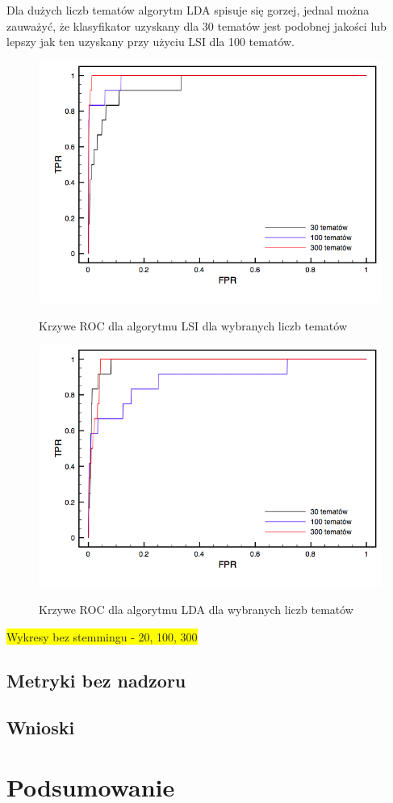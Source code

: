 \documentclass[11pt,a4paper]{article}
\newcommand{\todo}[1]{\colorbox{yellow}{#1}}
\begin{document}
Dla dużych liczb tematów algorytm LDA spisuje się gorzej, jednal można
zauważyć, że klasyfikator uzyskany dla 30 tematów jest podobnej jakości lub
lepszy jak ten uzyskany przy użyciu LSI dla 100 tematów.

\begin{figure}[h]
\caption{Krzywe ROC dla algorytmu LSI dla wybranych liczb tematów}
\includegraphics[width=\linewidth]{gfx/lsi_roc.png}
\label{roc_lsi}
\end{figure}

\begin{figure}[h]
\caption{Krzywe ROC dla algorytmu LDA dla wybranych liczb tematów}
\includegraphics[width=\linewidth]{gfx/lda_roc.png}
\label{roc_lda}
\end{figure}

\todo{Wykresy bez stemmingu - 20, 100, 300}

\FloatBarrier

\subsection{Metryki bez nadzoru}

\subsection{Wnioski}

\section{Podsumowanie}




\enddocument
\end{document}
